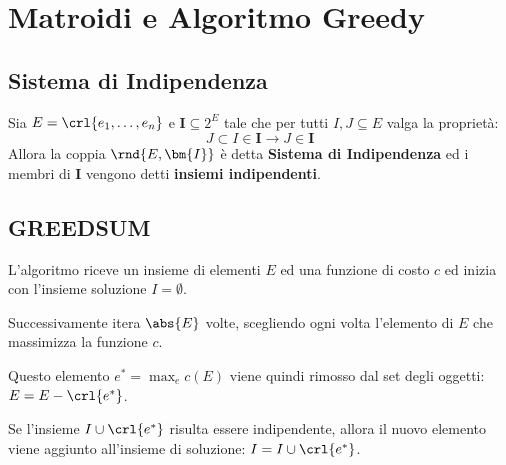 \documentclass[\main/main.tex]{subfiles}
\begin{document}
\chapter{Matroidi e Algoritmo Greedy}
\section{Sistema di Indipendenza}
\begin{definition}
  Sia \(E = \crl{e_1, \ldots, e_n}\) e \(\bm{I} \subseteq 2^E\) tale che per tutti \(I, J \subseteq E\) valga la proprietà:
  \[
    J \subset I \in \bm{I} \rightarrow J \in \bm{I}
  \]
  Allora la coppia \(\rnd{E, \bm{I}}\) è detta \textbf{Sistema di Indipendenza} ed i membri di \(\bm{I}\) vengono detti \textbf{insiemi indipendenti}.
\end{definition}
\section{GREEDSUM}
L'algoritmo riceve un insieme di elementi \(E\) ed una funzione di costo \(c\) ed inizia con l'insieme soluzione \(I = \emptyset \).

Successivamente itera \(\abs{E}\) volte, scegliendo ogni volta l'elemento di \(E\) che massimizza la funzione \(c\).

Questo elemento \(e^* = \max_e c(E)\) viene quindi rimosso dal set degli oggetti: \(E = E - \crl{e^*}\).

Se l'insieme \(I \cup \crl{e^*}\) risulta essere indipendente, allora il nuovo elemento viene aggiunto all'insieme di soluzione: \(I = I \cup \crl{e^*}\).
\end{document}
